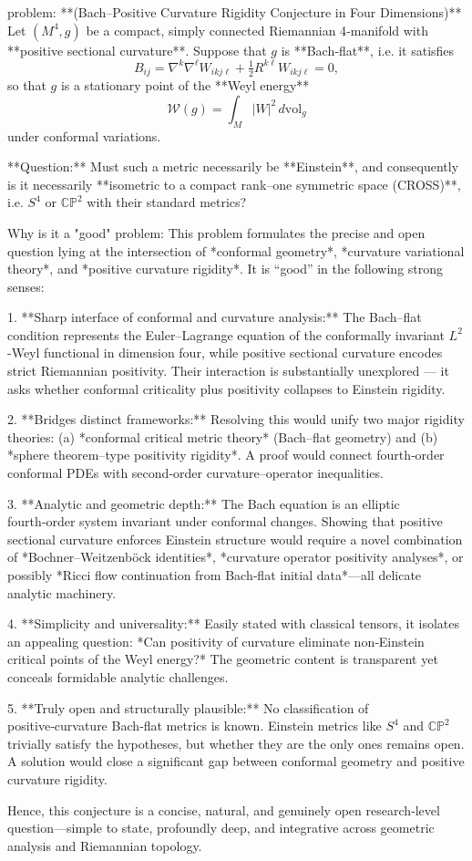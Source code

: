 problem:  
**(Bach–Positive Curvature Rigidity Conjecture in Four Dimensions)**  
Let \((M^4,g)\) be a compact, simply connected Riemannian 4‑manifold with **positive sectional curvature**.  
Suppose that \(g\) is **Bach‑flat**, i.e. it satisfies  
\[
B_{ij} = \nabla^k \nabla^\ell W_{ikj\ell} + \tfrac{1}{2} R^{k\ell} W_{ikj\ell} = 0,
\]  
so that \(g\) is a stationary point of the **Weyl energy**
\[
\mathcal{W}(g) = \int_M |W|^2\, d\mathrm{vol}_g
\]
under conformal variations.

**Question:**  
Must such a metric necessarily be **Einstein**, and consequently is it necessarily **isometric to a compact rank–one symmetric space (CROSS)**, i.e. \(S^4\) or \(\mathbb{CP}^2\) with their standard metrics?

Why is it a "good" problem:  
This problem formulates the precise and open question lying at the intersection of *conformal geometry*, *curvature variational theory*, and *positive curvature rigidity*. It is “good” in the following strong senses:

1. **Sharp interface of conformal and curvature analysis:**  
   The Bach–flat condition represents the Euler–Lagrange equation of the conformally invariant \(L^2\)-Weyl functional in dimension four, while positive sectional curvature encodes strict Riemannian positivity. Their interaction is substantially unexplored — it asks whether conformal criticality plus positivity collapses to Einstein rigidity.

2. **Bridges distinct frameworks:**  
   Resolving this would unify two major rigidity theories: (a) *conformal critical metric theory* (Bach–flat geometry) and (b) *sphere theorem–type positivity rigidity*. A proof would connect fourth‑order conformal PDEs with second‑order curvature–operator inequalities.

3. **Analytic and geometric depth:**  
   The Bach equation is an elliptic fourth‑order system invariant under conformal changes. Showing that positive sectional curvature enforces Einstein structure would require a novel combination of *Bochner–Weitzenböck identities*, *curvature operator positivity analyses*, or possibly *Ricci flow continuation from Bach‑flat initial data*—all delicate analytic machinery.

4. **Simplicity and universality:**  
   Easily stated with classical tensors, it isolates an appealing question: *Can positivity of curvature eliminate non‑Einstein critical points of the Weyl energy?* The geometric content is transparent yet conceals formidable analytic challenges.

5. **Truly open and structurally plausible:**  
   No classification of positive‑curvature Bach‑flat metrics is known. Einstein metrics like \(S^4\) and \(\mathbb{CP}^2\) trivially satisfy the hypotheses, but whether they are the only ones remains open. A solution would close a significant gap between conformal geometry and positive curvature rigidity.

Hence, this conjecture is a concise, natural, and genuinely open research‑level question—simple to state, profoundly deep, and integrative across geometric analysis and Riemannian topology.